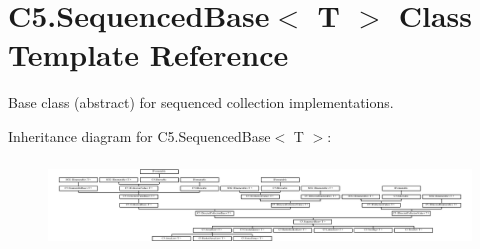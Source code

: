 \hypertarget{class_c5_1_1_sequenced_base}{}\section{C5.\+Sequenced\+Base$<$ T $>$ Class Template Reference}
\label{class_c5_1_1_sequenced_base}


Base class (abstract) for sequenced collection implementations.  


Inheritance diagram for C5.\+Sequenced\+Base$<$ T $>$\+:\begin{figure}[H]
\begin{center}
\leavevmode
\includegraphics[height=2.366197cm]{class_c5_1_1_sequenced_base}
\end{center}
\end{figure}
